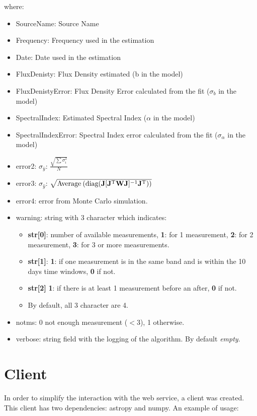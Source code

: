 \documentclass[10pt]{article}
\begin{document}
\noindent where:
\begin{itemize}
    \item SourceName: Source Name
    \item Frequency: Frequency used in the estimation
    \item Date: Date used in the estimation
    \item FluxDenisty: Flux Density estimated (b in the model)
    \item FluxDenistyError: Flux Density Error calculated from the fit ($\sigma_b$ in the model)
    \item SpectralIndex: Estimated Spectral Index ($\alpha$ in the model) 
    \item SpectralIndexError: Spectral Index error calculated from the fit ($\sigma_{\alpha}$ in the model)
    \item error2: $\sigma_{\bar{y}}$: $\frac{\sqrt{\sum\sigma_i^2}}{N}$
    \item error3: $\sigma_{\hat{y}}$: $\sqrt{\text{Average\:}(\text{diag}(\mathbf{J}[\mathbf{J}^{\text{T}}\mathbf{W}\mathbf{J}]^{-1}\mathbf{J}^{\text{T}}))} $
    \item error4: error from Monte Carlo simulation.
    \item warning: string with 3 character which indicates:
        \begin{itemize} 
            \item \textbf{str[0]}: number of available measurements, \textbf{1}: for 1 measurement, \textbf{2}: for 2 measurement, \textbf{3}: for 3 or more measurements.
            \item \textbf{str[1]}: \textbf{1}: if one measurement is in the same band and is within the 10 days time windows, \textbf{0} if not.
            \item \textbf{str[2]} \textbf{1}: if there is at least 1 measurement before an after, \textbf{0} if not.
            \item By default, all 3 character are 4.
        \end{itemize}
    \item notms: 0 not enough measurement ($<$3), 1 otherwise.
    \item verbose: string field with the logging of the algorithm. By default \emph{empty}.
\end{itemize}

\section{Client}
In order to simplify the interaction with the web service, a client was created.
This client has two dependencies: astropy and numpy. An example of usage:
\end{document}
